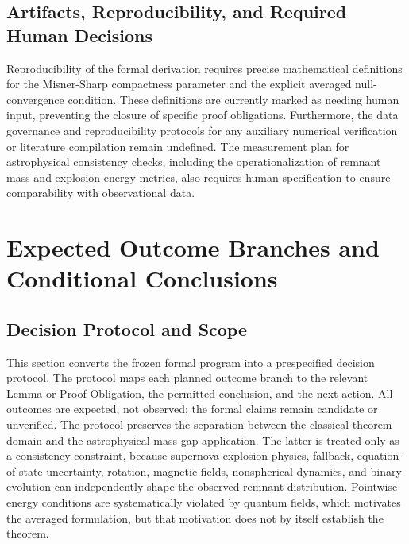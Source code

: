 \documentclass[conference]{IEEEtran}
\begin{document}
\subsection{Artifacts, Reproducibility, and Required Human Decisions}
Reproducibility of the formal derivation requires precise mathematical definitions for the Misner-Sharp compactness parameter and the explicit averaged null-convergence condition. These definitions are currently marked as needing human input, preventing the closure of specific proof obligations. Furthermore, the data governance and reproducibility protocols for any auxiliary numerical verification or literature compilation remain undefined. The measurement plan for astrophysical consistency checks, including the operationalization of remnant mass and explosion energy metrics, also requires human specification to ensure comparability with observational data.

\section{Expected Outcome Branches and Conditional Conclusions}
\subsection{Decision Protocol and Scope}
This section converts the frozen formal program into a prespecified decision protocol. The protocol maps each planned outcome branch to the relevant Lemma or Proof Obligation, the permitted conclusion, and the next action. All outcomes are expected, not observed; the formal claims remain candidate or unverified. The protocol preserves the separation between the classical theorem domain and the astrophysical mass-gap application. The latter is treated only as a consistency constraint, because supernova explosion physics, fallback, equation-of-state uncertainty, rotation, magnetic fields, nonspherical dynamics, and binary evolution can independently shape the observed remnant distribution. Pointwise energy conditions are systematically violated by quantum fields, which motivates the averaged formulation, but that motivation does not by itself establish the theorem.~\cite{cite_0ed84243cf171bc4}
\end{document}
